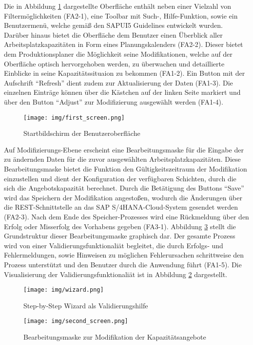 Die in Abbildung \ref{fig:main_screen} dargestellte Oberfläche enthält neben einer Vielzahl von Filtermöglichkeiten (FA2-1), eine Toolbar mit Such-, Hilfe-Funktion, sowie ein Benutzermenü, welche gemäß den SAPUI5 Guidelines entwickelt wurden. Darüber hinaus bietet die Oberfläche dem Benutzer einen Überblick aller Arbeitsplatzkapazitäten in Form eines Planungskalenders (FA2-2). Dieser bietet dem Produktionsplaner die Möglichkeit seine Modifikationen, welche auf der Oberfläche optisch hervorgehoben werden, zu überwachen und detaillierte Einblicke in seine Kapazitätssituaion zu bekommen (FA1-2). Ein Button mit der Aufschrift \enquote{Refresh} dient zudem zur Aktualisierung der Daten (FA1-3). Die einzelnen Einträge können über die Kästchen auf der linken Seite markiert und über den Button \enquote{Adjust} zur Modifizierung ausgewählt werden (FA1-4).
\begin{figure}[H]
	\centering 
	\texttt{[image: img/first\_screen.png]}
	\caption[Startbildschirm der Benutzeroberfläche]{\label{fig:main_screen}Startbildschirm der Benutzeroberfläche}
\end{figure}


Auf Modifizierungs-Ebene erscheint eine Bearbeitungsmaske für die Eingabe der zu ändernden Daten für die zuvor ausgewählten Arbeitsplatzkapazitäten. Diese Bearbeitungsmaske bietet die Funktion den Gültigkeitszeitraum der Modifikation einzustellen und dient der Konfiguration der verfügbaren Schichten, durch die sich die Angebotskapazität berechnet. Durch die Betätigung des Buttons \enquote{Save} wird das Speichern der Modifikation angestoßen, wodurch die Änderungen über die REST-Schnittstelle an das SAP S/4HANA-Cloud-System gesendet werden (FA2-3). Nach dem Ende des Speicher-Prozesses wird eine Rückmeldung über den Erfolg oder Misserfolg des Vorhabens gegeben (FA3-1). Abbildung \ref{fig:adjust} stellt die Grundstruktur dieser Bearbeitungsmaske graphisch dar. Der gesamte Prozess wird von einer Validierungsfunktionaliät begleitet, die durch Erfolgs- und Fehlermeldungen, sowie Hinweisen zu möglichen Fehlerursachen schrittweise den Prozess unterstützt und den Benutzer durch die Anwendung führt (FA1-5). Die Visualisierung der Validierungsfunktionaliät ist in Abbildung \ref{fig:wizard} dargestellt.

\begin{figure}[H]
	\centering 
	\texttt{[image: img/wizard.png]}
	\caption[Step-by-Step Wizard als Validierungshilfe]{\label{fig:wizard}Step-by-Step Wizard als Validierungshilfe}
\end{figure}

\begin{figure}[H]
	\centering 
	\texttt{[image: img/second\_screen.png]}
	\caption[Bearbeitungsmaske zur Modifikation der Kapazitätsangebote]{\label{fig:adjust}Bearbeitungsmaske zur Modifikation der Kapazitätsangebote}
\end{figure}

